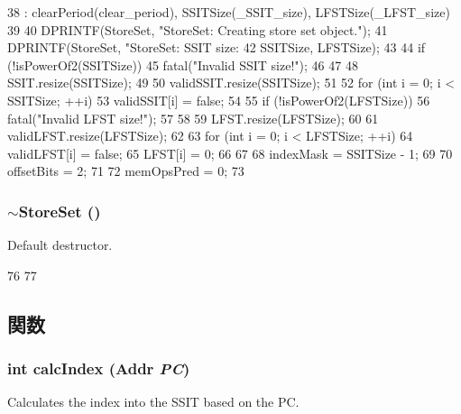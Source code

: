 \begin{DoxyCode}
38     : clearPeriod(clear_period), SSITSize(_SSIT_size), LFSTSize(_LFST_size)
39 {
40     DPRINTF(StoreSet, "StoreSet: Creating store set object.\n");
41     DPRINTF(StoreSet, "StoreSet: SSIT size: %
42             SSITSize, LFSTSize);
43 
44     if (!isPowerOf2(SSITSize)) {
45         fatal("Invalid SSIT size!\n");
46     }
47 
48     SSIT.resize(SSITSize);
49 
50     validSSIT.resize(SSITSize);
51 
52     for (int i = 0; i < SSITSize; ++i)
53         validSSIT[i] = false;
54 
55     if (!isPowerOf2(LFSTSize)) {
56         fatal("Invalid LFST size!\n");
57     }
58 
59     LFST.resize(LFSTSize);
60 
61     validLFST.resize(LFSTSize);
62 
63     for (int i = 0; i < LFSTSize; ++i) {
64         validLFST[i] = false;
65         LFST[i] = 0;
66     }
67 
68     indexMask = SSITSize - 1;
69 
70     offsetBits = 2;
71 
72     memOpsPred = 0;
73 }
\end{DoxyCode}
\hypertarget{classStoreSet_a7e8dc54e3df2141367927871901e6152}{
\subsubsection[{$\sim$StoreSet}]{\setlength{\rightskip}{0pt plus 5cm}$\sim${\bf StoreSet} ()}}
\label{classStoreSet_a7e8dc54e3df2141367927871901e6152}
Default destructor. 


\begin{DoxyCode}
76 {
77 }
\end{DoxyCode}


\subsection{関数}
\hypertarget{classStoreSet_aeabab6ef1f2a8e942739203158d70041}{
\subsubsection[{calcIndex}]{\setlength{\rightskip}{0pt plus 5cm}int calcIndex ({\bf Addr} {\em PC})}}
\label{classStoreSet_aeabab6ef1f2a8e942739203158d70041}
Calculates the index into the SSIT based on the PC. 


